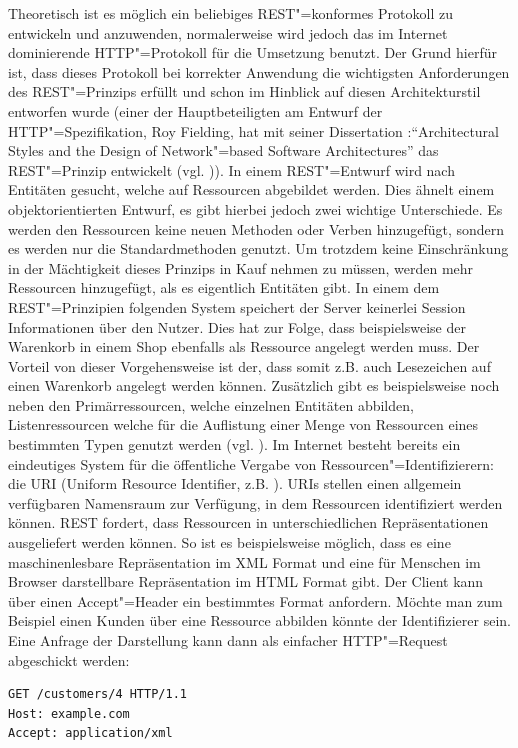 Theoretisch ist es möglich ein beliebiges REST"=konformes Protokoll zu entwickeln und anzuwenden, normalerweise wird jedoch das im Internet dominierende HTTP"=Protokoll für die Umsetzung benutzt. Der Grund hierfür ist, dass dieses Protokoll bei korrekter Anwendung die wichtigsten Anforderungen des REST"=Prinzips erfüllt und schon im Hinblick auf diesen Architekturstil entworfen wurde (einer der Hauptbeteiligten am Entwurf der HTTP"=Spezifikation, Roy Fielding, hat mit seiner Dissertation :"`Architectural Styles and the Design of Network"=based Software Architectures"' das REST"=Prinzip entwickelt (vgl. \cite{Fielding2000})). 
In einem REST"=Entwurf wird nach Entitäten gesucht, welche auf Ressourcen abgebildet werden. Dies ähnelt einem objektorientierten Entwurf, es gibt hierbei jedoch zwei wichtige Unterschiede. Es werden den Ressourcen keine neuen Methoden oder Verben hinzugefügt, sondern es werden nur die Standardmethoden genutzt. Um trotzdem keine Einschränkung in der Mächtigkeit dieses Prinzips in Kauf nehmen zu müssen, werden mehr Ressourcen hinzugefügt, als es eigentlich Entitäten gibt. In einem dem REST"=Prinzipien folgenden System speichert der Server keinerlei Session Informationen über den Nutzer. Dies hat zur Folge, dass beispielsweise der Warenkorb in einem Shop ebenfalls als Ressource angelegt werden muss. Der Vorteil von dieser Vorgehensweise ist der, dass somit z.B. auch Lesezeichen auf einen Warenkorb angelegt werden können. Zusätzlich gibt es beispielsweise noch neben den Primärressourcen, welche einzelnen Entitäten abbilden, Listenressourcen welche für die Auflistung einer Menge von Ressourcen eines bestimmten Typen genutzt werden (vgl. \cite{tilkovrest}). Im Internet besteht bereits ein eindeutiges System für die öffentliche Vergabe von Ressourcen"=Identifizierern: die URI (Uniform Resource Identifier, z.B. ). URIs stellen einen allgemein verfügbaren Namensraum zur Verfügung, in dem Ressourcen identifiziert werden können. REST fordert, dass Ressourcen in unterschiedlichen Repräsentationen ausgeliefert werden können. So ist es beispielsweise möglich, dass es eine maschinenlesbare Repräsentation im XML Format und eine für Menschen im Browser darstellbare Repräsentation im HTML Format gibt. Der Client kann über einen Accept"=Header ein bestimmtes Format anfordern.
Möchte man zum Beispiel einen Kunden über eine Ressource abbilden könnte der Identifizierer  sein. Eine Anfrage der Darstellung kann dann als einfacher HTTP"=Request abgeschickt werden:
\begin{lstlisting}
GET /customers/4 HTTP/1.1
Host: example.com
Accept: application/xml 
\end{lstlisting}
